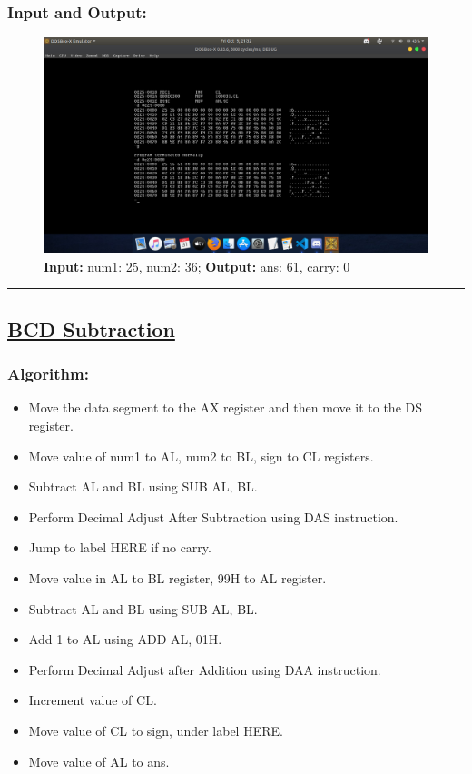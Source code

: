 \documentclass[10pt,a4paper]{article}
\begin{document}
\begin{flushleft}
\subsubsection*{\textbf{Input and Output:}}
\begin{figure}[h]
    \centering
    \includegraphics[trim = 100mm 60mm 100mm 80mm, clip, width = \textwidth]{Pics/BAIO.png}
    \caption{ \textbf{Input:} num1: 25, num2: 36; \newline \hspace{1cm}
              \textbf{Output:} ans: 61, carry: 0}
\end{figure}
\hrule
\newpage
\subsection*{\textbf{\underline{BCD Subtraction}}}

\subsubsection*{\textbf{Algorithm:}}
\begin{itemize}
    \item Move the data segment to the AX register and then move it to the DS register.
    \item Move value of num1 to AL, num2 to BL, sign to CL registers.
    \item Subtract AL and BL using SUB AL, BL.
    \item Perform Decimal Adjust After Subtraction using DAS instruction.
    \item Jump to label HERE if no carry.
    \item Move value in AL to BL register, 99H to AL register.
    \item Subtract AL and BL using SUB AL, BL.
    \item Add 1 to AL using ADD AL, 01H.
    \item Perform Decimal Adjust after Addition using DAA instruction.
    \item Increment value of CL.
    \item Move value of CL to sign, under label HERE.
    \item Move value of AL to ans.
\end{itemize}


\end{flushleft}
\end{document}
